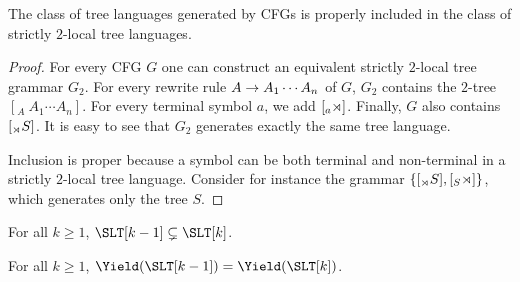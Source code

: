 \begin{theorem}
    The class of tree languages generated by CFGs is properly included in the class of strictly $2$-local tree languages.
\end{theorem}
%
\begin{proof}
    For every CFG $G$ one can construct an equivalent strictly $2$-local tree grammar $G_2$.
    For every rewrite rule $A \rightarrow A_1 \cdots A_n$ of $G$, $G_2$ contains the $2$-tree $[_A\ A_1 \cdots A_n]$.
    For every terminal symbol $a$, we add $[_a \rtimes ]$.
    Finally, $G$ also contains $[_{\rtimes} S]$.
    It is easy to see that $G_2$ generates exactly the same tree language.

    Inclusion is proper because a symbol can be both terminal and non-terminal in a strictly $2$-local tree language.
    Consider for instance the grammar $\left \{ [_{\rtimes} S], [_S \rtimes] \right \}$, which generates only the tree $S$.
\end{proof}

\begin{theorem}
    For all $k \geq 1$, $\SLT[k-1] \subsetneq \SLT[k]$.
\end{theorem}

\begin{theorem}
    For all $k \geq 1$, $\Yield(\SLT[k-1]) = \Yield(\SLT[k])$.
\end{theorem}
